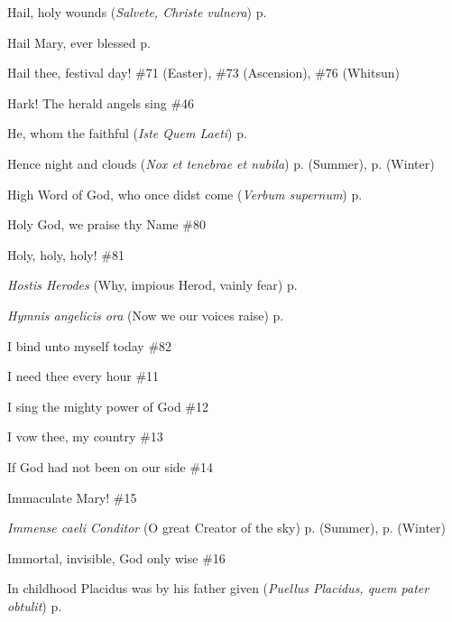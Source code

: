 \begin{hangparas}{1.25em}{1}
\par\noindent
Hail, holy wounds (\textit{Salvete, Christe vulnera}) \dotfill p. \pageref{PreciousBloodMattins}
\par\noindent
Hail Mary, ever blessed \dotfill p. \pageref{WalsinghamEvensong}
\par\noindent
Hail thee, festival day! \dotfill \#71 (Easter), \#73 (Ascension), \#76 (Whitsun)
\par\noindent
Hark! The herald angels sing \dotfill \#46
\par\noindent
He, whom the faithful (\textit{Iste Quem Laeti}) \dotfill p. \pageref{JosephMattins}
\par\noindent
Hence night and clouds (\textit{Nox et tenebrae et nubila}) \dotfill p. \pageref{WednesdayMattinsSummer} (Summer), p. \pageref{WednesdayMattinsWinter} (Winter)
\par\noindent
High Word of God, who once didst come (\textit{Verbum supernum}) \dotfill p. \pageref{FirstAdventInvitatory}
\par\noindent
Holy God, we praise thy Name \dotfill \#80
\par\noindent
Holy, holy, holy!  \dotfill \#81
\par\noindent
\textit{Hostis Herodes} (Why, impious Herod, vainly fear) \dotfill p. \pageref{EpiphanyEvensong}
\par\noindent
\textit{Hymnis angelicis ora} (Now we our voices raise) \dotfill p. \pageref{ScholasticaInvitatory}
\par\noindent
I bind unto myself today \dotfill \#82
\par\noindent
I need thee every hour \dotfill \#11
\par\noindent
I sing the mighty power of God \dotfill \#12
\par\noindent
I vow thee, my country \dotfill \#13
\par\noindent
If God had not been on our side \dotfill \#14
\par\noindent
Immaculate Mary! \dotfill \#15
\par\noindent
\textit{Immense caeli Conditor} (O great Creator of the sky) \dotfill p. \pageref{MondayEvensongSummer} (Summer), p. \pageref{MondayEvensongWinter} (Winter)
\par\noindent
Immortal, invisible, God only wise \dotfill \#16
\par\noindent
In childhood Placidus was by his father given (\textit{Puellus Placidus, quem pater obtulit}) \dotfill p. \pageref{MaurusInvitatory}
\par\noindent

\end{hangparas}

